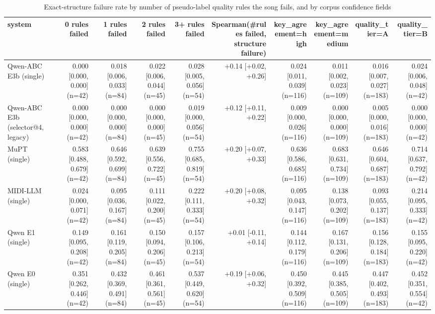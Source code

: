 \begin{table}[t]
\centering
\small
\begin{tabular}{lrrrrrrrrr}
\toprule
system & 0 rules failed & 1 rules failed & 2 rules failed & 3+ rules failed & Spearman(\#rules failed, structure failure) & key\_agreement=high & key\_agreement=medium & quality\_tier=A & quality\_tier=B \\
\midrule
Qwen-ABC E3b (single) & 0.000 [0.000, 0.000] (n=42) & 0.018 [0.006, 0.033] (n=84) & 0.022 [0.006, 0.044] (n=45) & 0.028 [0.005, 0.056] (n=54) & +0.14 [+0.02, +0.26] & 0.024 [0.011, 0.039] (n=116) & 0.011 [0.002, 0.023] (n=109) & 0.016 [0.007, 0.027] (n=183) & 0.024 [0.006, 0.048] (n=42) \\
Qwen-ABC E3b (selector@4, legacy) & 0.000 [0.000, 0.000] (n=42) & 0.000 [0.000, 0.000] (n=84) & 0.000 [0.000, 0.000] (n=45) & 0.019 [0.000, 0.056] (n=54) & +0.12 [+0.11, +0.22] & 0.009 [0.000, 0.026] (n=116) & 0.000 [0.000, 0.000] (n=109) & 0.005 [0.000, 0.016] (n=183) & 0.000 [0.000, 0.000] (n=42) \\
MuPT (single) & 0.583 [0.488, 0.679] (n=42) & 0.646 [0.592, 0.699] (n=84) & 0.639 [0.556, 0.722] (n=45) & 0.755 [0.685, 0.819] (n=54) & +0.20 [+0.07, +0.33] & 0.636 [0.586, 0.685] (n=116) & 0.683 [0.631, 0.734] (n=109) & 0.646 [0.604, 0.687] (n=183) & 0.714 [0.637, 0.792] (n=42) \\
MIDI-LLM (single) & 0.024 [0.000, 0.071] (n=42) & 0.095 [0.036, 0.167] (n=84) & 0.111 [0.022, 0.200] (n=45) & 0.222 [0.111, 0.333] (n=54) & +0.20 [+0.08, +0.32] & 0.095 [0.043, 0.147] (n=116) & 0.138 [0.073, 0.202] (n=109) & 0.093 [0.055, 0.137] (n=183) & 0.214 [0.095, 0.333] (n=42) \\
Qwen E1 (single) & 0.149 [0.095, 0.208] (n=42) & 0.161 [0.119, 0.205] (n=84) & 0.150 [0.094, 0.206] (n=45) & 0.157 [0.106, 0.213] (n=54) & +0.01 [-0.11, +0.14] & 0.144 [0.112, 0.179] (n=116) & 0.167 [0.131, 0.206] (n=109) & 0.156 [0.128, 0.184] (n=183) & 0.155 [0.095, 0.220] (n=42) \\
Qwen E0 (single) & 0.351 [0.262, 0.446] (n=42) & 0.432 [0.369, 0.491] (n=84) & 0.461 [0.361, 0.561] (n=45) & 0.537 [0.449, 0.620] (n=54) & +0.19 [+0.06, +0.32] & 0.450 [0.392, 0.509] (n=116) & 0.445 [0.385, 0.505] (n=109) & 0.447 [0.402, 0.493] (n=183) & 0.452 [0.351, 0.554] (n=42) \\
\bottomrule
\end{tabular}
\caption{Exact-structure failure rate by number of pseudo-label quality rules the song fails, and by corpus confidence fields}
\label{tab:annotation_noise_dose}
\end{table}
